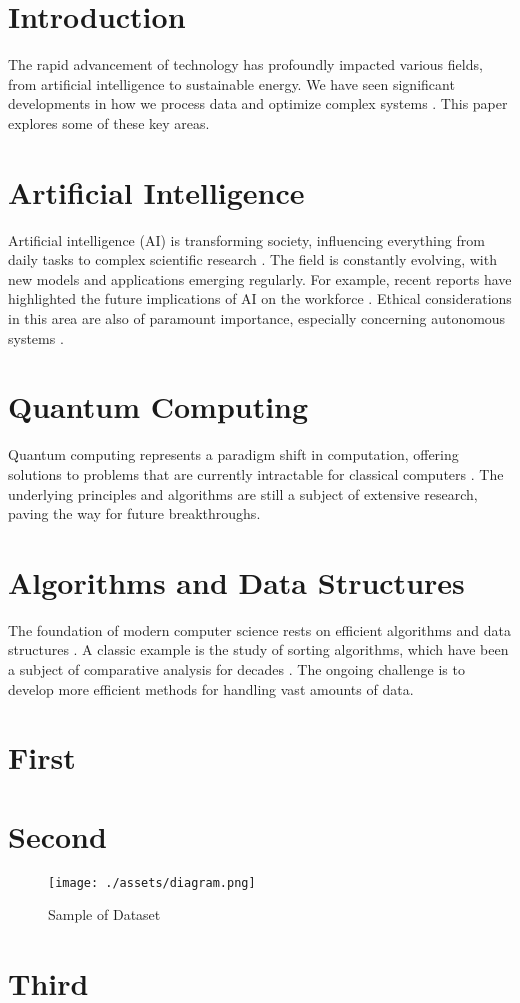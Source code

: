 \section{Introduction}
The rapid advancement of technology has profoundly impacted various fields, from artificial intelligence to sustainable energy. We have seen significant developments in how we process data and optimize complex systems \cite{Chen2021}. This paper explores some of these key areas.
\section{Artificial Intelligence}
Artificial intelligence (AI) is transforming society, influencing everything from daily tasks to complex scientific research \cite{Smith2023}. The field is constantly evolving, with new models and applications emerging regularly. For example, recent reports have highlighted the future implications of AI on the workforce \cite{AI_Report}. Ethical considerations in this area are also of paramount importance, especially concerning autonomous systems \cite{Garcia2016}.
\section{Quantum Computing}
Quantum computing represents a paradigm shift in computation, offering solutions to problems that are currently intractable for classical computers \cite{Doe2022}. The underlying principles and algorithms are still a subject of extensive research, paving the way for future breakthroughs.
\section{Algorithms and Data Structures}
The foundation of modern computer science rests on efficient algorithms and data structures \cite{Brown2018}. A classic example is the study of sorting algorithms, which have been a subject of comparative analysis for decades \cite{Wilson2017}. The ongoing challenge is to develop more efficient methods for handling vast amounts of data.
\section{First}
\lipsum[6-10]
\section{Second}
\lipsum[11-12]
\begin{figure}
    \centering
    \texttt{[image: ./assets/diagram.png]}
    \caption{Sample of Dataset}
    \label{figure:sample-dataset}
\end{figure}
\lipsum[13-15]
\section{Third}
\lipsum[16-20]
